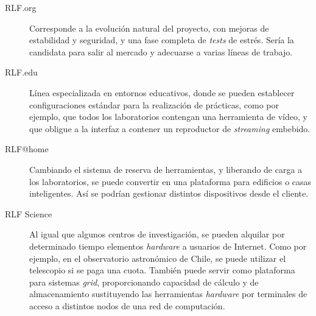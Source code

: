 \begin{description}
\item[RLF.org] Corresponde a la evolución natural del proyecto, con 
mejoras de estabilidad y seguridad, y una fase completa de 
\emph{tests} de estrés. Sería la candidata para salir al 
mercado y adecuarse a varias líneas de trabajo. 
\item[RLF.edu] Línea especializada en entornos educativos, donde se 
pueden establecer configuraciones estándar para la realización de 
prácticas, como por ejemplo, que todos los laboratorios contengan una 
herramienta de vídeo, y que obligue a la interfaz a contener un 
reproductor de \emph{streaming} embebido.
\item[RLF@home] Cambiando el sistema de reserva de herramientas, y 
liberando de carga a los laboratorios, se puede convertir en una 
plataforma para edificios o casas inteligentes. Así se podrían 
gestionar distintos dispositivos desde el cliente.
\item[RLF Science] Al igual que algunos centros de investigación, se 
pueden alquilar por determinado tiempo elementos \emph{hardware} a 
usuarios de Internet. Como por ejemplo, en el observatorio astronómico 
de Chile, se puede utilizar el telescopio si se paga una cuota. 
También puede servir como plataforma para sistemas \emph{grid}, 
proporcionando capacidad de cálculo y de almacenamiento sustituyendo las 
herramientas \emph{hardware} por terminales de acceso a distintos 
nodos de una red de computación.
\end{description}


